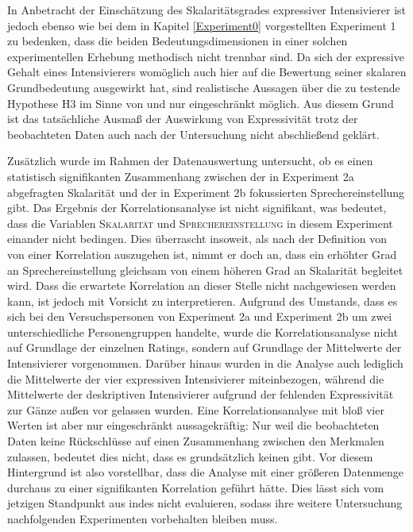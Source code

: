 In Anbetracht der Einschätzung des Skalaritätsgrades expressiver Intensivierer ist jedoch ebenso wie bei dem in Kapitel \ref{Experiment0} vorgestellten {Experiment 1} zu bedenken, dass die beiden Bedeutungsdimensionen in einer solchen experimentellen Erhebung methodisch nicht trennbar sind. Da sich der expressive Gehalt eines Intensivierers womöglich auch hier auf die Bewertung seiner skalaren Grundbedeutung ausgewirkt hat, sind realistische Aussagen über die zu testende Hypothese H3 im Sinne von \citet[22]{Paradis.1997} und {\citet[133]{Gutzmann.2019a}} nur eingeschränkt möglich. Aus diesem Grund ist das tatsächliche Ausmaß der Auswirkung von Expressivität trotz der beobachteten Daten auch nach der Untersuchung nicht abschließend geklärt.


Zusätzlich wurde im Rahmen der Datenauswertung untersucht, ob es einen statistisch signifikanten Zusammenhang zwischen der in {Experiment 2a} abgefragten Skalarität und der in Experiment 2b fokussierten Sprechereinstellung gibt. Das Ergebnis der Korrelationsanalyse ist nicht signifikant, was bedeutet, dass die Variablen \textsc{Skalarität} und \textsc{Sprechereinstellung} in diesem Experiment einander nicht bedingen. Dies überrascht insoweit, als nach der Definition von {\citet[133]{Gutzmann.2019a}} von einer Korrelation auszugehen ist, nimmt er doch an, dass ein erhöhter Grad an Sprechereinstellung gleichsam von einem höheren Grad an Skalarität begleitet wird. Dass die erwartete Korrelation an dieser Stelle nicht nachgewiesen werden kann, ist jedoch mit Vorsicht zu interpretieren. Aufgrund des Umstands, dass es sich bei den Versuchspersonen von Experiment 2a und {Experiment 2b} um zwei unterschiedliche Personengruppen handelte, wurde die Korrelationsanalyse nicht auf Grundlage der einzelnen Ratings, sondern auf Grundlage der Mittelwerte der Intensivierer vorgenommen. Darüber hinaus  wurden in die Analyse auch lediglich die Mittelwerte der vier expressiven Intensivierer miteinbezogen, während die Mittelwerte der deskriptiven Intensivierer aufgrund der fehlenden Expressivität zur Gänze außen vor gelassen wurden. Eine Korrelationsanalyse mit bloß vier Werten ist aber nur eingeschränkt aussagekräftig: Nur weil die beobachteten Daten keine Rückschlüsse auf einen Zusammenhang zwischen den Merkmalen zulassen, bedeutet dies nicht, dass es grundsätzlich keinen gibt. Vor diesem Hintergrund ist also vorstellbar, dass die Analyse mit einer größeren Datenmenge durchaus zu einer signifikanten Korrelation geführt hätte. Dies lässt sich vom jetzigen Standpunkt aus indes nicht evaluieren, sodass ihre weitere Untersuchung nachfolgenden Experimenten vorbehalten bleiben muss.



